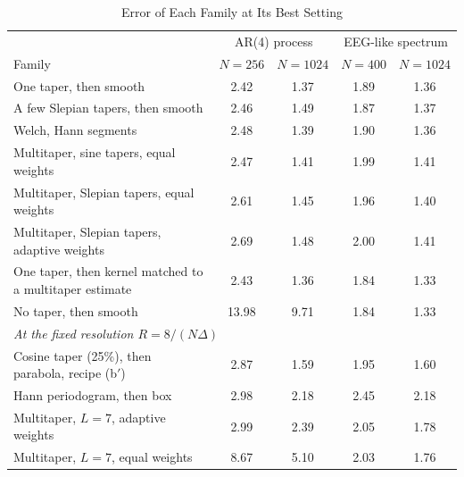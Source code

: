 \documentclass[10pt,twocolumn]{article}
\begin{document}
\begin{table}[!t]
\caption{Error of Each Family at Its Best Setting}
\label{tab:tuned}
\centering
\footnotesize
\begin{tabular}{lcccc}
\toprule
 & \multicolumn{2}{c}{AR(4) process} & \multicolumn{2}{c}{EEG-like spectrum}\\
Family & $N=256$ & $N=1024$ & $N=400$ & $N=1024$\\
\midrule
One taper, then smooth & 2.42 & 1.37 & 1.89 & 1.36\\
A few Slepian tapers, then smooth & 2.46 & 1.49 & 1.87 & 1.37\\
Welch, Hann segments & 2.48 & 1.39 & 1.90 & 1.36\\
Multitaper, sine tapers, equal weights & 2.47 & 1.41 & 1.99 & 1.41\\
Multitaper, Slepian tapers, equal weights & 2.61 & 1.45 & 1.96 & 1.40\\
Multitaper, Slepian tapers, adaptive weights & 2.69 & 1.48 & 2.00 & 1.41\\
One taper, then kernel matched to a multitaper estimate & 2.43 & 1.36 & 1.84 & 1.33\\
No taper, then smooth & 13.98 & 9.71 & 1.84 & 1.33\\
\midrule
\multicolumn{5}{l}{\emph{At the fixed resolution $R=8/(N\Delta)$}}\\
Cosine taper (25\%), then parabola, recipe (b$'$) & 2.87 & 1.59 & 1.95 & 1.60\\
Hann periodogram, then box & 2.98 & 2.18 & 2.45 & 2.18\\
Multitaper, $L=7$, adaptive weights & 2.99 & 2.39 & 2.05 & 1.78\\
Multitaper, $L=7$, equal weights & 8.67 & 5.10 & 2.03 & 1.76\\
\bottomrule
\end{tabular}


\end{table}
\end{document}
